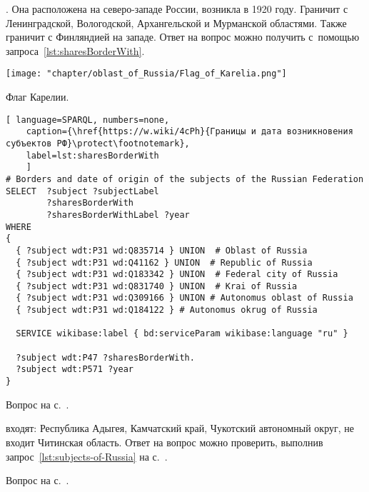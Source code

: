 \begin{task}
\label{answer:subjects_of_Russia_1}
. 
    Она расположена на северо-западе России, возникла в \num{1920} году. 
    Граничит с Ленинградской, Вологодской, Архангельской и Мурманской областями. 
    Также граничит с Финляндией на западе.  
    Ответ на вопрос можно получить с~помощью запроса~\ref{lst:sharesBorderWith}.
	
\begin{marginfigure}[0.0cm]
\centering\texttt{[image: "chapter/oblast\_of\_Russia/Flag\_of\_Karelia.png"]}
\caption [Флаг Карелии, Россия.]{Флаг Карелии.}%
\label{fig:Flag_of_Karelia}%
\end{marginfigure}

	
\begin{lstlisting}[ language=SPARQL, numbers=none,
	caption={\href{https://w.wiki/4cPh}{Границы и дата возникновения субъектов РФ}\protect\footnotemark},
	label=lst:sharesBorderWith
	]
# Borders and date of origin of the subjects of the Russian Federation
SELECT  ?subject ?subjectLabel 
        ?sharesBorderWith 
        ?sharesBorderWithLabel ?year
WHERE
{
  { ?subject wdt:P31 wd:Q835714 } UNION  # Oblast of Russia
  { ?subject wdt:P31 wd:Q41162 } UNION  # Republic of Russia
  { ?subject wdt:P31 wd:Q183342 } UNION  # Federal city of Russia
  { ?subject wdt:P31 wd:Q831740 } UNION  # Krai of Russia
  { ?subject wdt:P31 wd:Q309166 } UNION # Autonomus oblast of Russia
  { ?subject wdt:P31 wd:Q184122 } # Autonomus okrug of Russia
  
  SERVICE wikibase:label { bd:serviceParam wikibase:language "ru" }
  
  ?subject wdt:P47 ?sharesBorderWith. 
  ?subject wdt:P571 ?year
}
\end{lstlisting}
	
\small{\AnswerBackref Вопрос на с.~\pageref{lst:sharesBorderWith-oblast-of-Russia}.}
\end{task}



\begin{task}
	\label{answer:subjects_of_Russia_2}
     входят: Республика Адыгея, 
    Камчатский край, Чукотский автономный округ, не входит Читинская область. 
    Ответ на вопрос можно проверить, 
    выполнив запрос~\ref{lst:subjects-of-Russia} на с.~\pageref{lst:subjects-of-Russia}.

\small{\AnswerBackref Вопрос на с.~\pageref{lst:sharesBorderWith-empty-oblast-of-Russia}.}
\end{task}




